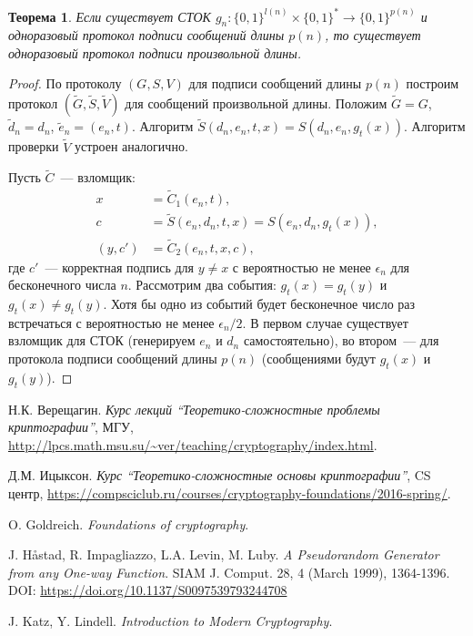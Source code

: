 \documentclass[12pt,a4paper]{article}
\newcommand{\bits}{\{0,1\}}
\theoremstyle{definition}
\theoremstyle{plain}
\newtheorem{theorem}{Теорема}[section]
\theoremstyle{remark}
\begin{document}
\begin{theorem}
Если существует СТОК $g_n: \bits^{l(n)}\times \bits^{*}\to \bits^{p(n)}$ и одноразовый протокол подписи сообщений длины
$p(n)$, то существует одноразовый протокол подписи произвольной длины.
\end{theorem}
\begin{proof}
По протоколу $(G,S,V)$ для подписи сообщений длины $p(n)$
построим протокол $(\tilde G,\tilde S,\tilde V)$ для
сообщений произвольной длины. Положим $\tilde G = G$, $\tilde d_n= d_n$, $\tilde e_n = (e_n, t)$. Алгоритм $\tilde S(d_n, e_n, t, x) = S(d_n, e_n, g_t(x))$. Алгоритм проверки $\tilde V$ устроен аналогично.

Пусть $\tilde C$~--- взломщик:
$$
\begin{aligned}
x &= \tilde C_1(e_n, t),\\
c &= \tilde S(e_n, d_n, t, x) = S(e_n, d_n, g_t(x)),\\
(y, c') &= \tilde C_2(e_n,t,x,c),
\end{aligned}
$$
где $c'$~--- корректная подпись для $y\neq x$ с вероятностью 
не менее $\epsilon_n$ для бесконечного числа $n$.
Рассмотрим два события: $g_t(x) = g_t(y)$ и $g_t(x) \neq g_t(y)$.
Хотя бы одно из событий будет бесконечное число раз встречаться
с вероятностью не менее $\epsilon_n/2$. В первом случае существует взломщик для СТОК (генерируем $e_n$ и $d_n$ самостоятельно), во втором~--- для протокола
подписи сообщений длины $p(n)$ (сообщениями будут $g_t(x)$ и $g_t(y)$).
 \end{proof}

\newpage
\begin{thebibliography}{9}
    
     Н.К. Верещагин. 
        \emph{Курс лекций ``Теоретико-сложностные проблемы криптографии''},
        МГУ, \url{http://lpcs.math.msu.su/~ver/teaching/cryptography/index.html}.
    
     Д.М. Ицыксон. \emph{Курс ``Теоретико-сложностные основы криптографии''}, 
        CS центр, \url{https://compsciclub.ru/courses/cryptography-foundations/2016-spring/}.

     O. Goldreich. \emph{Foundations of cryptography}.

     J. H\aa{}stad, R. Impagliazzo, L.A. Levin, M. Luby. 
        \emph{A Pseudorandom Generator from any One-way Function}.  
        SIAM J. Comput. 28, 4 (March 1999), 1364-1396.\\ 
        DOI: \url{https://doi.org/10.1137/S0097539793244708}
            
     J. Katz, Y. Lindell. \emph{Introduction to Modern Cryptography}.

\end{thebibliography}

\listoftodos
\end{document}
